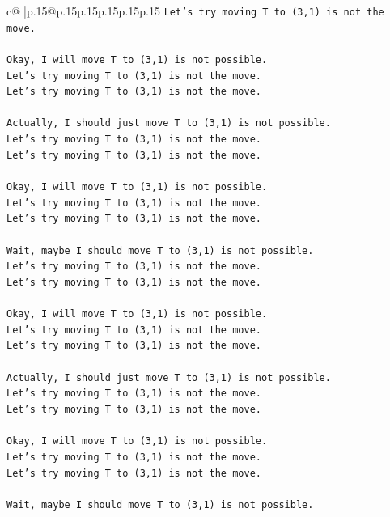 \documentclass{article}
\begin{document}
{\begin{supertabular}{c@{$\;$}|p{.15\linewidth}@{}p{.15\linewidth}p{.15\linewidth}p{.15\linewidth}p{.15\linewidth}p{.15\linewidth}}
{{{\texttt{Let's try moving T to (3,1) is not the move.} \\
\\ 
\texttt{Okay, I will move T to (3,1) is not possible.} \\
\texttt{Let's try moving T to (3,1) is not the move.} \\
\texttt{Let's try moving T to (3,1) is not the move.} \\
\\ 
\texttt{Actually, I should just move T to (3,1) is not possible.} \\
\texttt{Let's try moving T to (3,1) is not the move.} \\
\texttt{Let's try moving T to (3,1) is not the move.} \\
\\ 
\texttt{Okay, I will move T to (3,1) is not possible.} \\
\texttt{Let's try moving T to (3,1) is not the move.} \\
\texttt{Let's try moving T to (3,1) is not the move.} \\
\\ 
\texttt{Wait, maybe I should move T to (3,1) is not possible.} \\
\texttt{Let's try moving T to (3,1) is not the move.} \\
\texttt{Let's try moving T to (3,1) is not the move.} \\
\\ 
\texttt{Okay, I will move T to (3,1) is not possible.} \\
\texttt{Let's try moving T to (3,1) is not the move.} \\
\texttt{Let's try moving T to (3,1) is not the move.} \\
\\ 
\texttt{Actually, I should just move T to (3,1) is not possible.} \\
\texttt{Let's try moving T to (3,1) is not the move.} \\
\texttt{Let's try moving T to (3,1) is not the move.} \\
\\ 
\texttt{Okay, I will move T to (3,1) is not possible.} \\
\texttt{Let's try moving T to (3,1) is not the move.} \\
\texttt{Let's try moving T to (3,1) is not the move.} \\
\\ 
\texttt{Wait, maybe I should move T to (3,1) is not possible.} \\
}}}
\end{supertabular}}
\end{document}
